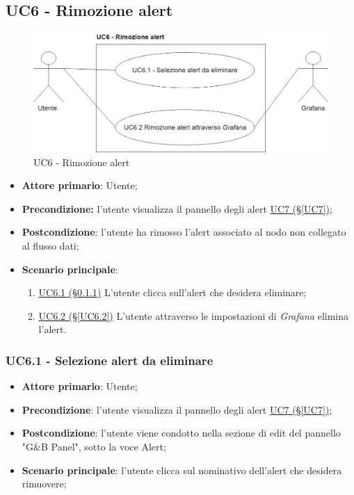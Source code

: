 \newpage

\subsection{UC6 - Rimozione alert}\label{UC6}

\begin{figure}[H]
	\centering
	\includegraphics[scale=0.4]{./images/UC6.png}
	\caption{UC6 - Rimozione alert}
\end{figure}

\begin{itemize}
	\item \textbf{Attore primario}: Utente;
	\item \textbf{Precondizione:} l'utente visualizza il pannello degli alert \hyperref[UC7]{UC7 (§\ref*{UC7})};
	\item \textbf{Postcondizione}: l'utente ha rimosso l'alert associato al nodo non collegato al flusso dati;
	\item \textbf{Scenario principale}: 
	\begin{enumerate}
		\item \hyperref[UC6.1]{UC6.1 (§\ref*{UC6.1})} L'utente clicca sull'alert che desidera eliminare;
		\item \hyperref[UC6.2]{UC6.2 (§\ref*{UC6.2})} L'utente attraverso le impostazioni di \textit{Grafana} elimina l'alert.
	\end{enumerate}
\end{itemize}

\subsubsection{UC6.1 - Selezione alert da eliminare}\label{UC6.1}
\begin{itemize}
	\item \textbf{Attore primario}: Utente;
	\item \textbf{Precondizione}:  l'utente visualizza il pannello degli alert \hyperref[UC7]{UC7 (§\ref*{UC7})};
	\item \textbf{Postcondizione}: l'utente viene condotto nella sezione di edit del pannello "G\&B Panel", sotto la voce Alert;
	\item \textbf{Scenario principale}: l'utente clicca sul nominativo dell'alert che desidera rimuovere;
\end{itemize}


